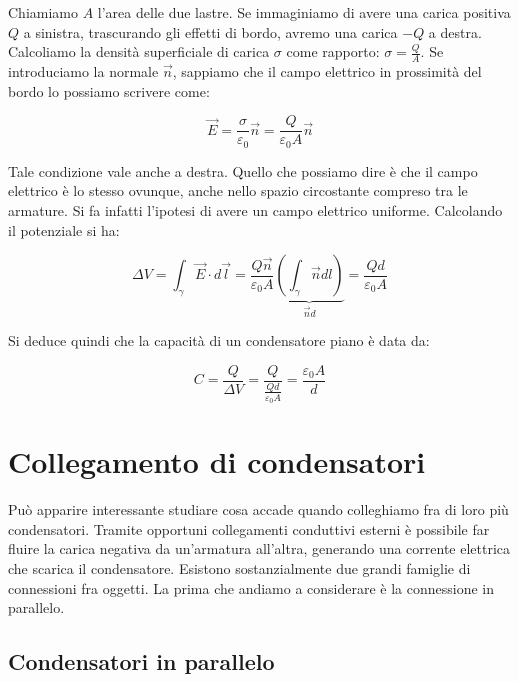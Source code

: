 \begin{figure}[htpb]
\end{figure}
\FloatBarrier

Chiamiamo $A$ l'area delle due lastre. Se immaginiamo di avere una carica positiva $Q$ a sinistra, trascurando gli effetti di bordo, avremo una carica $-Q$ a destra. Calcoliamo la densità superficiale di carica $\sigma$ come rapporto: $ \sigma = \frac{Q}{A} $.
Se introduciamo la normale $ \vec{n}  $, sappiamo che il campo elettrico in prossimità del bordo lo possiamo scrivere come:

\[
	\vec{E} =\frac{\sigma}{\varepsilon_0}\vec{n} = \frac{Q}{\varepsilon_0 A} \vec{n}
\]

Tale condizione vale anche a destra. Quello che possiamo dire è che il campo elettrico è lo stesso ovunque, anche nello spazio circostante compreso tra le armature. Si fa infatti l'ipotesi di avere un campo elettrico uniforme.
Calcolando il potenziale si ha:

\[
	\Delta V = \int_{\gamma} \vec{E} \cdot d\vec{l} =\frac{Q\vec{n}}{\varepsilon_0 A} \underbrace{\left( \int_{\gamma}\vec{n} dl  \right)}_{\vec{n} d}= \frac{Qd}{\varepsilon_0 A}
\]

Si deduce quindi che la capacità di un condensatore piano è data da:

\[
	C = \frac{Q}{\Delta V} = \frac{Q}{\frac{Qd}{\varepsilon_0 A}} = \frac{\varepsilon_0 A}{d}
\]

\section{Collegamento di condensatori}

Può apparire interessante studiare cosa accade quando colleghiamo fra di loro più condensatori. Tramite opportuni collegamenti conduttivi esterni è possibile far fluire la carica negativa da un'armatura all'altra, generando una corrente elettrica che scarica il condensatore. Esistono sostanzialmente due grandi famiglie di connessioni fra oggetti. La prima che andiamo a considerare è la connessione in parallelo.

\subsection{Condensatori in parallelo}

